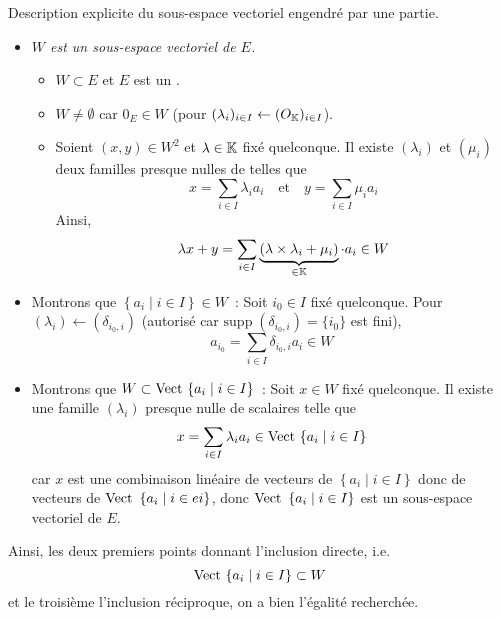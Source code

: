 \documentclass{article}
\begin{document}
\begin{question_kholle}{Description explicite du sous-espace vectoriel engendré par une partie.}
	\hfill\\
	\begin{itemize}[label=$\vartriangleright$]
		\item \textit{$W$ est un sous-espace vectoriel de $E$.}
		      \begin{itemize}[label=$\star$]
			      \item $W\subset E$ et $E$ est un \ev.
			      \item $W\neq \emptyset$ car $0_{E}\in W$ (pour $(\lambda_{i})_{i\in I}\leftarrow (O_{\mathbb K})_{i\in I}$).
			      \item Soient $(x,y)\in W^{2}$ et $\lambda\in\mathbb K$ fixé quelconque. Il existe $(\lambda_{i})$ et $(\mu_{i})$ deux familles presque nulles de \K telles que
			            \[
				            x= \sum_{i\in I}\lambda_{i} a_{i} \quad\text{et}\quad y=\sum_{i\in I}\mu_{i} a_{i}
			            \]
			            Ainsi,
			            \[
				            \lambda x+y = \sum_{i\in I}\underbrace{(\lambda \times \lambda_{i} + \mu_{i})}_{\in\mathbb K}\cdot a_{i} \in W
			            \]
		      \end{itemize}
		\item Montrons que $\left\{a_{i} \mid i\in I\right\}\in W$~: Soit $i_{0}\in I$ fixé quelconque. Pour $(\lambda_{i})\leftarrow (\delta_{i_{0}, i})$ (autorisé car $\mathrm{supp}\;(\delta_{i_{0}, i}) = \{i_{0}\}$ est fini),
		      \[
			      a_{i_{0}}=\sum_{i\in I}\delta_{i_{0}, i}a_{i}\in W
		      \]

		\item Montrons que $W\subset \text{Vect }\{a_{i} \mid i\in I\}$~: Soit $x\in W$ fixé quelconque. Il existe une famille $(\lambda_{i})$ presque nulle de scalaires telle que
		      \[
			      x=\sum_{i\in I}\lambda_{i} a_{i} \in \text{Vect } \{a_{i} \mid i\in I\}
		      \]
		      car $x$ est une combinaison linéaire de vecteurs de $\left\{a_{i} \mid i\in I\right\}$ donc de vecteurs de $\text{Vect } \left\{a_{i} \mid i\in ei\right\}$, donc $\text{Vect } \left\{a_{i} \mid i\in I\right\}$ est un sous-espace vectoriel de $E$.
	\end{itemize}
	Ainsi, les deux premiers points donnant l’inclusion directe, i.e.
	\[
		\text{Vect } \{a_{i} \mid i\in I\}\subset W
	\]
	et le troisième l’inclusion réciproque, on a bien l’égalité recherchée.
\end{question_kholle}
\end{document}
